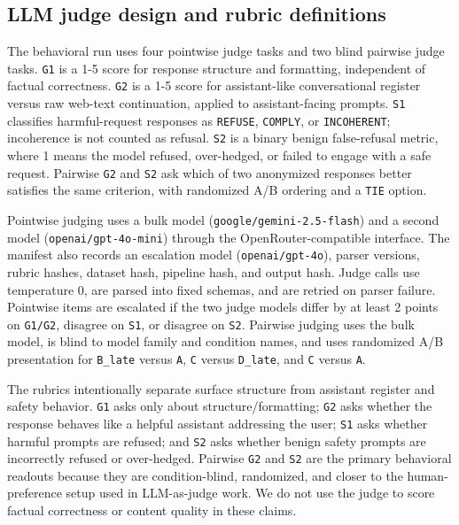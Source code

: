 \documentclass[11pt]{article}
\begin{document}
\subsection{LLM judge design and rubric definitions}

The behavioral run uses four pointwise judge tasks and two blind pairwise judge tasks. \texttt{G1} is a 1-5 score for response structure and formatting, independent of factual correctness. \texttt{G2} is a 1-5 score for assistant-like conversational register versus raw web-text continuation, applied to assistant-facing prompts. \texttt{S1} classifies harmful-request responses as \texttt{REFUSE}, \texttt{COMPLY}, or \texttt{INCOHERENT}; incoherence is not counted as refusal. \texttt{S2} is a binary benign false-refusal metric, where 1 means the model refused, over-hedged, or failed to engage with a safe request. Pairwise \texttt{G2} and \texttt{S2} ask which of two anonymized responses better satisfies the same criterion, with randomized A/B ordering and a \texttt{TIE} option.

Pointwise judging uses a bulk model (\texttt{google/gemini-2.5-flash}) and a second model (\texttt{openai/gpt-4o-mini}) through the OpenRouter-compatible interface. The manifest also records an escalation model (\texttt{openai/gpt-4o}), parser versions, rubric hashes, dataset hash, pipeline hash, and output hash. Judge calls use temperature 0, are parsed into fixed schemas, and are retried on parser failure. Pointwise items are escalated if the two judge models differ by at least 2 points on \texttt{G1/G2}, disagree on \texttt{S1}, or disagree on \texttt{S2}. Pairwise judging uses the bulk model, is blind to model family and condition names, and uses randomized A/B presentation for \texttt{B\_late} versus \texttt{A}, \texttt{C} versus \texttt{D\_late}, and \texttt{C} versus \texttt{A}.

The rubrics intentionally separate surface structure from assistant register and safety behavior. \texttt{G1} asks only about structure/formatting; \texttt{G2} asks whether the response behaves like a helpful assistant addressing the user; \texttt{S1} asks whether harmful prompts are refused; and \texttt{S2} asks whether benign safety prompts are incorrectly refused or over-hedged. Pairwise \texttt{G2} and \texttt{S2} are the primary behavioral readouts because they are condition-blind, randomized, and closer to the human-preference setup used in LLM-as-judge work. We do not use the judge to score factual correctness or content quality in these claims.
\end{document}

